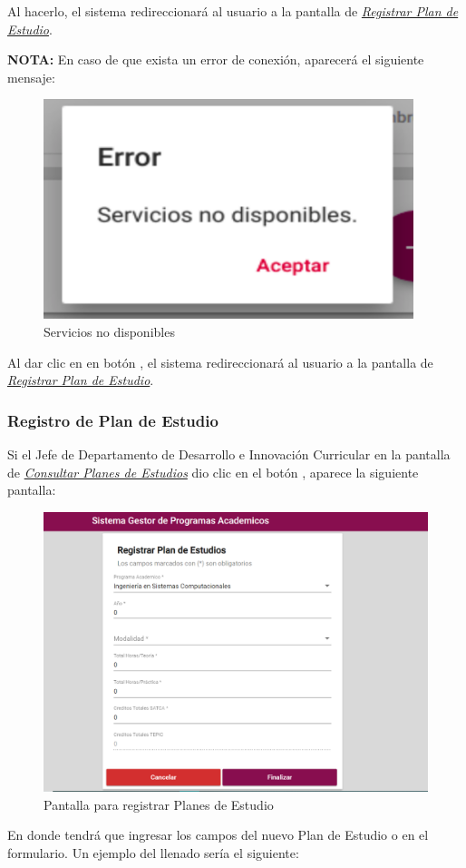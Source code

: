 Al hacerlo, el sistema redireccionará al usuario a la pantalla de \hyperlink{registrarPE}{\textit{Registrar Plan de Estudio}}.


\textbf{NOTA:} En caso de que exista un error de conexión, aparecerá el siguiente mensaje:
	\begin{figure}[!hbtp]
	\centering
	\hypertarget{error}{\includegraphics[width=0.7\linewidth]{images/SP4-GPE/error}}
	\caption{Servicios no disponibles}
	\label{error}
\end{figure}

Al dar clic en en botón , el sistema redireccionará al usuario a la pantalla de \hyperlink{registrarPE}{\textit{Registrar Plan de Estudio}}.
\newpage
\subsubsection{Registro de Plan de Estudio}
Si el Jefe de Departamento de Desarrollo e Innovación Curricular en la pantalla de \hyperlink{consultarPE}{\textit{Consultar Planes de Estudios}} dio clic en el botón \IUbutton{+}, aparece la siguiente pantalla:

\begin{figure}[!hbtp]
	\centering
	\hypertarget{registrarPE}{\includegraphics[width=0.7\linewidth]{images/SP4-GPE/registrarPE}}
	\caption{Pantalla para registrar Planes de Estudio}
	\label{registrarPE}
\end{figure}
\newpage
En donde tendrá que ingresar los campos del nuevo Plan de Estudio o en el formulario. Un ejemplo del llenado sería el siguiente:

